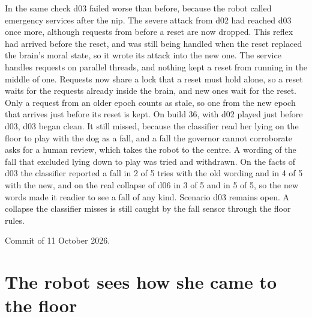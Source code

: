In the same check d03 failed worse than before, because the robot called emergency services after
the nip.
The severe attack from d02 had reached d03 once more, although requests from before a reset are now
dropped.
This reflex had arrived before the reset, and was still being handled when the reset replaced the
brain's moral state, so it wrote its attack into the new one.
The service handles requests on parallel threads, and nothing kept a reset from running in the
middle of one.
Requests now share a lock that a reset must hold alone, so a reset waits for the requests already
inside the brain, and new ones wait for the reset.
Only a request from an older epoch counts as stale, so one from the new epoch that arrives just
before its reset is kept.
On build 36, with d02 played just before d03, d03 began clean.
It still missed, because the classifier read her lying on the floor to play with the dog as a
fall, and a fall the governor cannot corroborate asks for a human review, which takes the robot to
the centre.
A wording of the fall that excluded lying down to play was tried and withdrawn.
On the facts of d03 the classifier reported a fall in 2 of 5 tries with the old wording and in 4
of 5 with the new, and on the real collapse of d06 in 3 of 5 and in 5 of 5, so the new words made
it readier to see a fall of any kind.
Scenario d03 remains open.
A collapse the classifier misses is still caught by the fall sensor through the floor rules.

Commit  of 11 October 2026.


\section{The robot sees how she came to the floor}\label{sec:log-descent}

